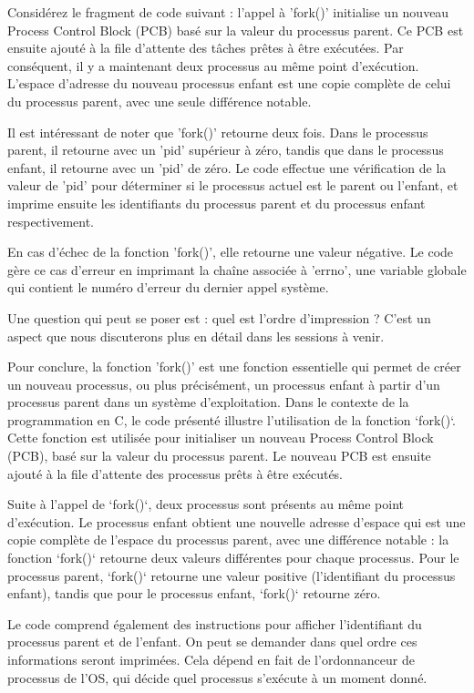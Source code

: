 \documentclass[12pt]{article}
\begin{document}
Considérez le fragment de code suivant : l'appel à 'fork()' initialise un nouveau Process Control Block (PCB) basé sur la valeur du processus parent. Ce PCB est ensuite ajouté à la file d'attente des tâches prêtes à être exécutées. Par conséquent, il y a maintenant deux processus au même point d'exécution. L'espace d'adresse du nouveau processus enfant est une copie complète de celui du processus parent, avec une seule différence notable.

Il est intéressant de noter que 'fork()' retourne deux fois. Dans le processus parent, il retourne avec un 'pid' supérieur à zéro, tandis que dans le processus enfant, il retourne avec un 'pid' de zéro. Le code effectue une vérification de la valeur de 'pid' pour déterminer si le processus actuel est le parent ou l'enfant, et imprime ensuite les identifiants du processus parent et du processus enfant respectivement. 

En cas d'échec de la fonction 'fork()', elle retourne une valeur négative. Le code gère ce cas d'erreur en imprimant la chaîne associée à 'errno', une variable globale qui contient le numéro d'erreur du dernier appel système.

Une question qui peut se poser est : quel est l'ordre d'impression ? C'est un aspect que nous discuterons plus en détail dans les sessions à venir. 

Pour conclure, la fonction 'fork()' est une fonction essentielle qui permet de créer un nouveau processus, ou plus précisément, un processus enfant à partir d'un processus parent dans un système d'exploitation.
Dans le contexte de la programmation en C, le code présenté illustre l'utilisation de la fonction `fork()`. Cette fonction est utilisée pour initialiser un nouveau Process Control Block (PCB), basé sur la valeur du processus parent. Le nouveau PCB est ensuite ajouté à la file d'attente des processus prêts à être exécutés. 

Suite à l'appel de `fork()`, deux processus sont présents au même point d'exécution. Le processus enfant obtient une nouvelle adresse d'espace qui est une copie complète de l'espace du processus parent, avec une différence notable : la fonction `fork()` retourne deux valeurs différentes pour chaque processus. Pour le processus parent, `fork()` retourne une valeur positive (l'identifiant du processus enfant), tandis que pour le processus enfant, `fork()` retourne zéro. 

Le code comprend également des instructions pour afficher l'identifiant du processus parent et de l'enfant. On peut se demander dans quel ordre ces informations seront imprimées. Cela dépend en fait de l'ordonnanceur de processus de l'OS, qui décide quel processus s'exécute à un moment donné. 
\end{document}
